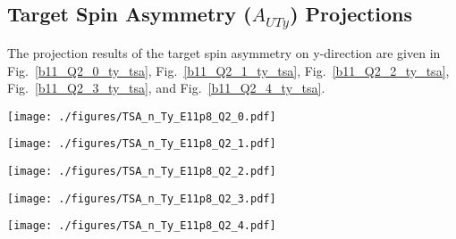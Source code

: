 \clearpage
\subsection{Target Spin Asymmetry ($A_{UTy}$) Projections}
 The projection results of the target spin asymmetry on y-direction are given in Fig.~\ref{b11_Q2_0_ty_tsa}, Fig.~\ref{b11_Q2_1_ty_tsa}, Fig.~\ref{b11_Q2_2_ty_tsa}, Fig.~\ref{b11_Q2_3_ty_tsa}, and Fig.~\ref{b11_Q2_4_ty_tsa}. 

\begin{sidewaysfigure}[!ht]
 \begin{center}
  \texttt{[image: ./figures/TSA\_n\_Ty\_E11p8\_Q2\_0.pdf]}
  \caption{\footnotesize{Transversely polarized target asymmetry ($A_{UTy}$) distributions distribution at $Q^{2}\sim 1.5~GeV^{2}$ with $E_{beam}=8.8~GeV~and~11~GeV$}}
  \label{b11_Q2_0_ty_tsa}
 \end{center}
\end{sidewaysfigure}
\begin{sidewaysfigure}[!ht]
 \begin{center}
  \texttt{[image: ./figures/TSA\_n\_Ty\_E11p8\_Q2\_1.pdf]}
  \caption{\footnotesize{Transversely polarized target asymmetry ($A_{UTy}$) distributions distribution at $Q^{2}\sim 2.5~GeV^{2}$ with $E_{beam}=8.8~GeV~and~11~GeV$}}
  \label{b11_Q2_1_ty_tsa}
 \end{center}
\end{sidewaysfigure}
\begin{sidewaysfigure}[!ht]
 \begin{center}
  \texttt{[image: ./figures/TSA\_n\_Ty\_E11p8\_Q2\_2.pdf]}
  \caption{\footnotesize{Transversely polarized target asymmetry ($A_{UTy}$) distributions distribution at $Q^{2}\sim 3.5~GeV^{2}$ with $E_{beam}=8.8~GeV~and~11~GeV$}}
  \label{b11_Q2_2_ty_tsa}
 \end{center}
\end{sidewaysfigure}
\begin{sidewaysfigure}[!ht]
 \begin{center}
  \texttt{[image: ./figures/TSA\_n\_Ty\_E11p8\_Q2\_3.pdf]}
  \caption{\footnotesize{Transversely polarized target asymmetry ($A_{UTy}$) distributions distribution at $Q^{2}\sim 4.5~GeV^{2}$ with $E_{beam}=8.8~GeV~and~11~GeV$}}
  \label{b11_Q2_3_ty_tsa}
 \end{center}
\end{sidewaysfigure}
\begin{sidewaysfigure}[!ht]
 \begin{center}
  \texttt{[image: ./figures/TSA\_n\_Ty\_E11p8\_Q2\_4.pdf]}
  \caption{\footnotesize{Transversely polarized target asymmetry ($A_{UTy}$) distributions distribution at $Q^{2}\sim 5.5~GeV^{2}$ with $E_{beam}=8.8~GeV~and~11~GeV$}}
  \label{b11_Q2_4_ty_tsa}
 \end{center}
\end{sidewaysfigure}

